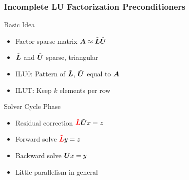 



\begin{frame}[fragile]
\frametitle{Incomplete LU Factorization Preconditioners}

  \begin{minipage}{0.5\textwidth}
    \begin{block}{Basic Idea}
      \begin{itemize}
        \item Factor sparse matrix $\boldsymbol{A} \approx \tilde{\boldsymbol{L}} \tilde{\boldsymbol{U}}$
        \item $\tilde{\boldsymbol{L}}$ and $\tilde{\boldsymbol{U}}$ sparse, triangular
        \item ILU0: Pattern of $\tilde{\boldsymbol{L}}$, $\tilde{\boldsymbol{U}}$ equal to $\boldsymbol{A}$
        \item ILUT: Keep $k$ elements per row
      \end{itemize}
    \end{block}
  \end{minipage}
%
  \begin{minipage}{0.45\textwidth}
    \begin{block}{Solver Cycle Phase}
      \vspace*{-0.1cm}
      \begin{itemize}
        \item Residual correction ${\color{red}\tilde{\matrix L}} \tilde{\matrix U} x = z$
        \item Forward solve ${\color{red}\tilde{\matrix L}} y = z$
        \item Backward solve $\tilde{\boldsymbol{U}} x = y$
        \item Little parallelism in general
      \end{itemize}
    \end{block}
  \end{minipage}



\end{frame}
